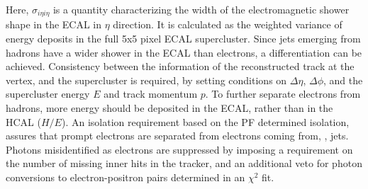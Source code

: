 Here, $\sigma_{i\eta i\eta}$ is a quantity characterizing the width of the electromagnetic shower shape in the ECAL in $\eta$ direction. It is calculated as the weighted variance of energy deposits in the full 5x5 pixel ECAL supercluster. Since jets emerging from hadrons have a wider shower in the ECAL than electrons, a differentiation can be achieved. Consistency between the information of the reconstructed track at the vertex, and the supercluster is required, by setting conditions on $\Delta\eta$, $\Delta\phi$, and the supercluster energy $E$ and track momentum $p$. To further separate electrons from hadrons, more energy should be deposited in the ECAL, rather than in the HCAL ($H/E$). An isolation requirement based on the PF determined isolation, assures that prompt electrons are separated from electrons coming from, \eg, jets. Photons misidentified as electrons are suppressed by imposing a requirement on the number of missing inner hits in the tracker, and an additional veto for photon conversions to electron-positron pairs determined in an $\chi^2$ fit.


